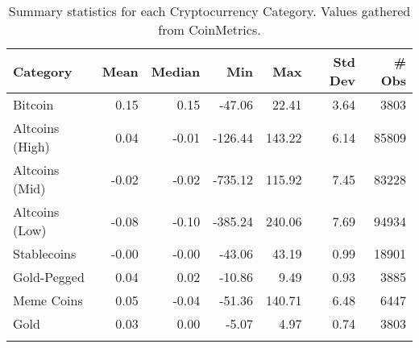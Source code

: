 \begin{table}[ht]
\centering
\scriptsize
\setlength{\tabcolsep}{4pt}
\begin{tabular}{lrrrrrr}
\toprule
Category & Mean & Median & Min & Max & Std Dev & \# Obs \\
\midrule
Bitcoin & 0.15 & 0.15 & -47.06 & 22.41 & 3.64 & 3803 \\
\addlinespace
Altcoins (High) & 0.04 & -0.01 & -126.44 & 143.22 & 6.14 & 85809 \\
\addlinespace
Altcoins (Mid) & -0.02 & -0.02 & -735.12 & 115.92 & 7.45 & 83228 \\
\addlinespace
Altcoins (Low) & -0.08 & -0.10 & -385.24 & 240.06 & 7.69 & 94934 \\
\addlinespace
Stablecoins & -0.00 & -0.00 & -43.06 & 43.19 & 0.99 & 18901 \\
\addlinespace
Gold-Pegged & 0.04 & 0.02 & -10.86 & 9.49 & 0.93 & 3885 \\
\addlinespace
Meme Coins & 0.05 & -0.04 & -51.36 & 140.71 & 6.48 & 6447 \\
\addlinespace
Gold & 0.03 & 0.00 & -5.07 & 4.97 & 0.74 & 3803 \\
\addlinespace
\bottomrule
\end{tabular}
\caption{Summary statistics for each Cryptocurrency Category. Values gathered from CoinMetrics.}
\label{tab:return_summary}
\end{table}

